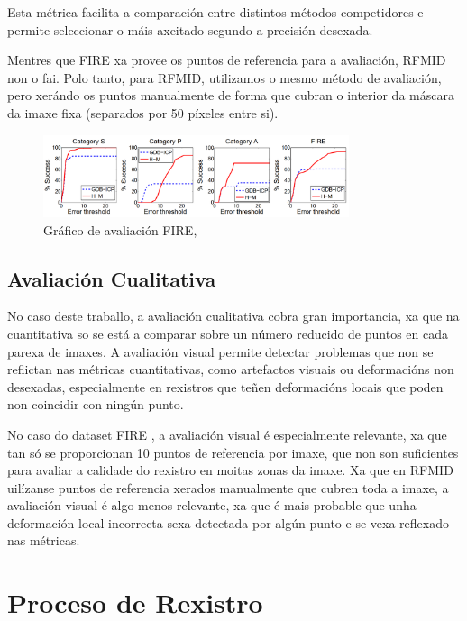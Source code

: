 Esta métrica facilita a comparación entre distintos métodos competidores e permite seleccionar o máis axeitado segundo a precisión desexada.
 
 Mentres que FIRE xa provee os puntos de referencia para a avaliación, RFMID non o fai.
 Polo tanto, para RFMID, utilizamos o mesmo método de avaliación, pero xerándo os puntos manualmente de forma que cubran o interior da máscara da imaxe fixa (separados por 50 píxeles entre si).
 
 \begin{figure}[ht]
    \centering
    \includegraphics[width=0.8\textwidth]{imaxes/fire_aval.png}
    \caption{Gráfico de avaliación FIRE, \cite{FIRE}}
    \label{fig:fire_aval}
\end{figure}

\subsection{Avaliación Cualitativa}
\label{subsec:Avaliación Cualitativa}

No caso deste traballo, a avaliación cualitativa cobra gran importancia, xa que na cuantitativa so se está a comparar sobre un número reducido de puntos en cada parexa de imaxes.
A avaliación visual permite detectar problemas que non se reflictan nas métricas cuantitativas, como artefactos visuais ou deformacións non desexadas, 
especialmente en rexistros que teñen deformacións locais que poden non coincidir con ningún punto.

No caso do dataset FIRE \cite{FIRE}, a avaliación visual é especialmente relevante, xa que tan só se proporcionan 10 puntos de referencia por imaxe, que non son suficientes para avaliar a calidade do rexistro en moitas zonas da imaxe.
Xa que en RFMID \cite{RFMiD} uilízanse puntos de referencia xerados manualmente que cubren toda a imaxe, a avaliación visual é algo menos relevante, xa que é mais probable que unha deformación local incorrecta sexa detectada por algún punto e se vexa reflexado nas métricas.

\section{Proceso de Rexistro}
\label{sec:Proceso de Rexistro}

